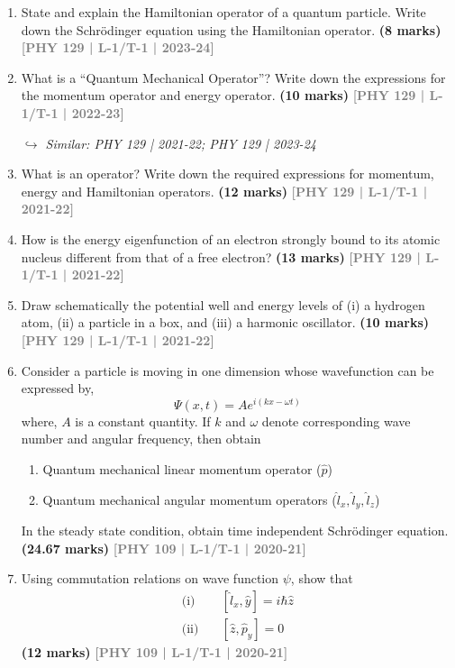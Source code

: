 \documentclass[12pt,a3paper]{article}
\newcommand{\yr}[1]{\hfill\textcolor{gray}{\small\textbf{[#1]}}}
\newcommand{\mk}[1]{\textcolor{orange!70!black}{\small\textbf{(#1 marks)}}}
\newcommand{\variant}[1]{\par\vspace{1pt}\textcolor{blue!50!black}%
  {\footnotesize\textit{$\hookrightarrow$ Similar: #1}}}
\begin{document}
\begin{enumerate}

\item State and explain the Hamiltonian operator of a quantum particle. Write down the Schr\"odinger equation using the Hamiltonian operator.
\mk{8} \yr{PHY 129 | L-1/T-1 | 2023-24}

\item What is a ``Quantum Mechanical Operator''? Write down the expressions for the momentum operator and energy operator.
\mk{10} \yr{PHY 129 | L-1/T-1 | 2022-23}
\variant{PHY 129 | 2021-22; PHY 129 | 2023-24}

\item What is an operator? Write down the required expressions for momentum, energy and Hamiltonian operators.
\mk{12} \yr{PHY 129 | L-1/T-1 | 2021-22}

\item How is the energy eigenfunction of an electron strongly bound to its atomic nucleus different from that of a free electron?
\mk{13} \yr{PHY 129 | L-1/T-1 | 2021-22}

\item Draw schematically the potential well and energy levels of (i) a hydrogen atom, (ii) a particle in a box, and (iii) a harmonic oscillator.
\mk{10} \yr{PHY 129 | L-1/T-1 | 2021-22}

\item Consider a particle is moving in one dimension whose wavefunction can be expressed by,
\[
\Psi(x,t) = A e^{i(kx - \omega t)}
\]
where, $A$ is a constant quantity. If $k$ and $\omega$ denote corresponding wave number and angular frequency, then obtain

\begin{enumerate}
    \item[(i)] Quantum mechanical linear momentum operator ($\hat{p}$)
    \item[(ii)] Quantum mechanical angular momentum operators ($\hat{l}_x, \hat{l}_y, \hat{l}_z$)
\end{enumerate}

\noindent In the steady state condition, obtain time independent Schrödinger equation.
\mk{24.67} \yr{PHY 109 | L-1/T-1 | 2020-21}



\item Using commutation relations on wave function $\psi$, show that 
\begin{align*}
    \text{(i)} \quad & [\hat{l}_x, \hat{y}] = i \hbar \hat{z} \\
    \text{(ii)} \quad & [\hat{z}, \hat{p}_y] = 0
\end{align*}
\mk{12} \yr{PHY 109 | L-1/T-1 | 2020-21}


\end{enumerate}
\end{document}
